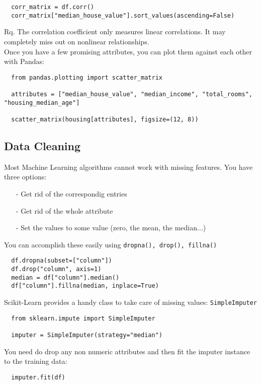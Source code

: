 \documentclass[french]{article}
\begin{document}
\begin{lstlisting}
  corr_matrix = df.corr()
  corr_matrix["median_house_value"].sort_values(ascending=False)
\end{lstlisting}

Rq. The correlation coefficient only measures linear correlations. It may completely miss out on nonlinear relationships.\\

Once you have a few promising attributes, you can plot them against each other with Pandas:
\begin{lstlisting}
  from pandas.plotting import scatter_matrix

  attributes = ["median_house_value", "median_income", "total_rooms", "housing_median_age"]

  scatter_matrix(housing[attributes], figsize=(12, 8))
\end{lstlisting}

\subsection{Data Cleaning}

Most Machine Learning algorithms cannot work with missing features. You have three options:
\begin{itemize}
  \item [-] Get rid of the correspondig entries
  \item [-] Get rid of the whole attribute
  \item [-] Set the values to some value (zero, the mean, the median...)
\end{itemize}

You can accomplish these easily using \lstinline{dropna(), drop(), fillna()}
\begin{lstlisting}
  df.dropna(subset=["column"])
  df.drop("column", axis=1)
  median = df["column"].median()
  df["column"].fillna(median, inplace=True)
\end{lstlisting}

Scikit-Learn provides a handy class to take care of missing values: \lstinline{SimpleImputer}
\begin{lstlisting}
  from sklearn.impute import SimpleImputer

  imputer = SimpleImputer(strategy="median")
\end{lstlisting}

You need do drop any non numeric attributes and then fit the imputer instance to the training data:
\begin{lstlisting}
  imputer.fit(df)
\end{lstlisting}
\end{document}
